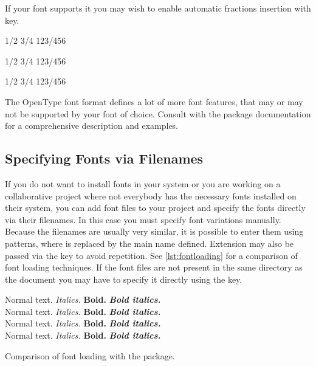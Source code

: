 If your font supports it you may wish to enable automatic fractions insertion
with  key.
\begin{example}
1/2 3/4 123/456

\setmainfont[
  Fractions=On,
]{Latin Modern Roman}
1/2 3/4 123/456

\setmainfont[
  Fractions=On,
]{Source Serif Pro}
1/2 3/4 123/456
\end{example}

The OpenType font format defines a lot of more font features, that may or may not
be supported by your font of choice. Consult with the  package
documentation for a comprehensive description and examples.

\subsection{Specifying Fonts via Filenames}\label{ssec:fonts_filename}

If you do not want to install fonts in your system or you are working on a
collaborative project where not everybody has the necessary fonts installed on their system,
you can add font files to your project and specify the fonts directly via their filenames.
In this case you must specify
font variations manually. Because the filenames are usually very similar, it is
possible to enter them using \cargv{*} patterns, where \cargv{*} is replaced by
the main name defined. Extension may also be passed via the 
key to avoid repetition. See \autoref{lst:fontloading} for a comparison of font
loading techniques. If the font files are not present in the same directory as
the document you may have to specify it directly using the  key.
\begin{listing}
  \begin{example}[vertical_mode, examplewidth=0.8\linewidth]
\setmainfont{Source Serif Pro}
Normal text. \textit{Italics.} \textbf{Bold.}
\textit{\textbf{Bold italics.}} \\

\setmainfont{SourceSerifPro-Regular.otf}
Normal text. \textit{Italics.} \textbf{Bold.}
\textit{\textbf{Bold italics.}} \\
 
\setmainfont[
  ItalicFont=SourceSerifPro-RegularIt.otf,
  BoldFont=SourceSerifPro-Bold.otf,
  BoldItalicFont=SourceSerifPro-BoldIt.otf,
]{SourceSerifPro-Regular.otf}
Normal text. \textit{Italics.} \textbf{Bold.}
\textit{\textbf{Bold italics.}} \\

\setmainfont[
  Extension=.otf,
  UprightFont=*-Regular,
  ItalicFont=*-RegularIt,
  BoldFont=*-Bold,
  BoldItalicFont=*-BoldIt,
]{SourceSerifPro}
Normal text. \textit{Italics.} \textbf{Bold.}
\textit{\textbf{Bold italics.}}
\end{example}
  \caption{Comparison of font loading with the 
    package.}\label{lst:fontloading}
\end{listing}

